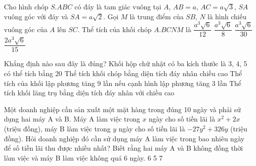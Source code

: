 \begin{ex}%
	Cho hình chóp $S.ABC$ có đáy là tam giác vuông tại $A$, $AB=a$, $AC=a\sqrt{3}$, $SA$ vuông góc với đáy và $SA=a\sqrt{2}$. Gọi $M$ là trung điểm của $SB$, $N$ là hình chiếu vuông góc của $A$ lên $SC$. Thể tích của khối chóp $A.BCNM$ là
	\choice
	{$\dfrac{{{a}^{3}}\sqrt{6}}{12}$}
	{$\dfrac{{{a}^{3}}\sqrt{6}}{8}$}
	{$\dfrac{{{a}^{3}}\sqrt{6}}{30}$}
	{\True $\dfrac{2{{a}^{3}}\sqrt{6}}{15}$}
\end{ex}
\begin{ex}%
	Khẳng định nào sau đây là đúng?
	\choice
	{Khối hộp chữ nhật có ba kích thước là 3, 4, 5 có thể tích bằng 20}
	{Thể tích khối chóp bằng diện tích đáy nhân chiều cao}
	{Thể tích của khối lập phương tăng 9 lần nếu cạnh hình lập phương tăng 3 lần}
	{\True Thể tích khối lăng trụ bằng diện tích đáy nhân với chiều cao}
\end{ex}
\begin{ex}%
	
	Một doanh nghiệp cần sản xuất một mặt hàng trong đúng 10 ngày và phải sử dụng hai máy A và B. Máy A làm việc trong  $x$  ngày cho số tiền lãi là  ${{x}^{2}}+2x$  (triệu đồng), máy B làm việc trong  $y$  ngày cho số tiền lãi là  $-27{{y}^{2}}+326y$  (triệu đồng). Hỏi doanh nghiệp đó cần sử dụng máy A làm việc trong bao nhiêu ngày để số tiền lãi thu được nhiều nhất? Biết rằng hai máy A và B không đồng thời làm việc và máy B làm việc không quá 6 ngày.
	\choice
	{6}
	{5}
	{7}
	{}
\end{ex}
